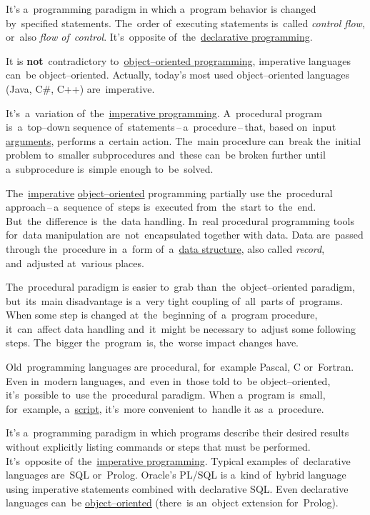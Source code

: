 \label{imperativeprogramming}
It's a~programming paradigm in which a~program behavior is changed by~specified statements.
The~order of~executing statements is~called \textit{control flow}, or~also \textit{flow of~control}.
It's~opposite of~the~\hyperref[declarativeprogramming]{declarative programming}.

\warning It is \textbf{not}~contradictory to~\hyperref[objectorientedprogramming]{object--oriented programming}, imperative languages can~be object--oriented.
Actually, today's most used object--oriented languages (Java, C\#, C++) are~imperative.

It's~a~variation of~the~\hyperref[imperativeprogramming]{imperative programming}.
A~procedural program is~a~top--down sequence of~statements\,--\,a~procedure\,--\,that, based on~input \hyperref[parameterargument]{arguments}, performs a~certain action.
The~main procedure can~break the~initial problem to~smaller subprocedures and~these can~be broken further until a~subprocedure is~simple enough to~be~solved.

The~\hyperref[imperativeprogramming]{imperative} \hyperref[objectorientedprogramming]{object--oriented} programming partially use the~procedural approach\,--\,a~sequence of~steps is~executed from~the~start to~the~end.
But~the~difference is~the~data handling.
In~real procedural programming tools for~data manipulation are~not~encapsulated together with data.
Data are~passed through the~procedure in~a~form of~a~\hyperref[objectdatastructure]{data structure}, also called \textit{record}, and~adjusted at~various places.

The~procedural paradigm is easier to~grab than~the~object--oriented paradigm, but~its~main disadvantage is a~very tight coupling of~all~parts of~programs.
When some step is changed at~the~beginning of~a~program procedure, it~can~affect data handling and~it~might be necessary to~adjust some following steps.
The~bigger the~program~is, the~worse impact changes have.

Old~programming languages are procedural, for~example Pascal, C or~Fortran.
Even in~modern languages, and~even in~those told to~be object--oriented, it's~possible to~use the~procedural paradigm.
When a~program is~small, for~example, a~\hyperref[scriptinglanguages]{script}, it's~more convenient to~handle it as~a~procedure.

\label{declarativeprogramming}
It's a~programming paradigm in which programs describe their desired results without explicitly listing commands or steps that must be performed.
It's~opposite of~the~\hyperref[imperativeprogramming]{imperative programming}.
Typical examples of~declarative languages are~SQL or~Prolog.
Oracle's PL/SQL is a~kind of~hybrid language using imperative statements combined with declarative SQL.
Even declarative languages can~be \hyperref[objectorientedprogramming]{object--oriented} (there~is an~object extension for~Prolog).
\newpage

